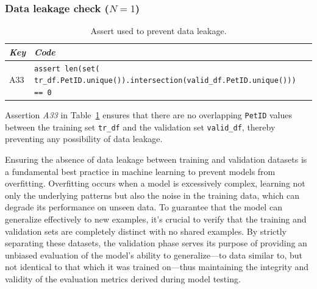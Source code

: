 
\subsubsection{Data leakage check ($N = 1$)}

\begin{table}
  \centering
  \caption{Assert used to prevent data leakage.}
  \begin{tabular}{@{}m{} m{}@{}}
    \toprule
    \emph{\textbf{Key}}&
    \emph{\textbf{Code}}\\
    \midrule

    A33&
    \lstinline[]$assert len(set( tr_df.PetID.unique()).intersection(valid_df.PetID.unique())) == 0$\\
    \bottomrule
  \end{tabular}
  \label{tab:data-leakage}
\end{table}

Assertion \emph{A33} in Table~\ref{tab:data-leakage} ensures that there are no overlapping \texttt{PetID} values between the training set \texttt{tr\_df} and the validation set \texttt{valid\_df}, thereby preventing any possibility of data leakage.

Ensuring the absence of data leakage between training and validation datasets is a fundamental best practice in machine learning to prevent models from overfitting. Overfitting occurs when a model is excessively complex, learning not only the underlying patterns but also the noise in the training data, which can degrade its performance on unseen data. To guarantee that the model can generalize effectively to new examples, it's crucial to verify that the training and validation sets are completely distinct with no shared examples. By strictly separating these datasets, the validation phase serves its purpose of providing an unbiased evaluation of the model's ability to generalize---to data similar to, but not identical to that which it was trained on---thus maintaining the integrity and validity of the evaluation metrics derived during model testing.

